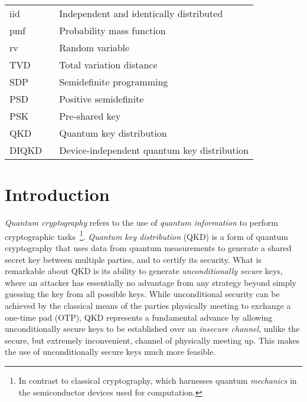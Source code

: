 \documentclass[10pt, a4paper]{article}
\numberwithin{equation}{section} %
\theoremstyle{definition}
\theoremstyle{plain}
\newcommand{\?}{\mathrel{?}} %
\begin{document}
\begin{center}
\begin{longtable*}{p{0.2\linewidth}|p{0.8\linewidth}}
        iid & Independent and identically distributed \\
        pmf & Probability mass function \\
        rv & Random variable \\
        TVD & Total variation distance \\
        SDP & Semidefinite programming \\
        PSD & Positive semidefinite \\
        PSK & Pre-shared key \\
        QKD & Quantum key distribution \\
        DIQKD & Device-independent quantum key distribution \\
      \end{longtable*}
    \end{center}
    \clearpage

    \section{Introduction}

    \emph{Quantum cryptography} refers to the use of \emph{quantum information} to perform cryptographic tasks~\cite{SecurityQKD, AdvancesQuantumCrypto}\footnote{In contrast to classical cryptography, which harnesses quantum \emph{mechanics} in the semiconductor devices used for computation.}. \emph{Quantum key distribution} (QKD) is a form of quantum cryptography that uses data from quantum measurements to generate a shared secret key between multiple parties, and to certify its security. What is remarkable about QKD is its ability to generate \emph{unconditionally secure} keys, where an attacker has essentially no advantage from any strategy beyond simply guessing the key from all possible keys. While unconditional security can be achieved by the classical means of the parties physically meeting to exchange a one-time pad (OTP), QKD represents a fundamental advance by allowing unconditionally secure keys to be established over an \emph{insecure channel}, unlike the secure, but extremely inconvenient, channel of physically meeting up. This makes the use of unconditionally secure keys much more feasible.
\end{document}
